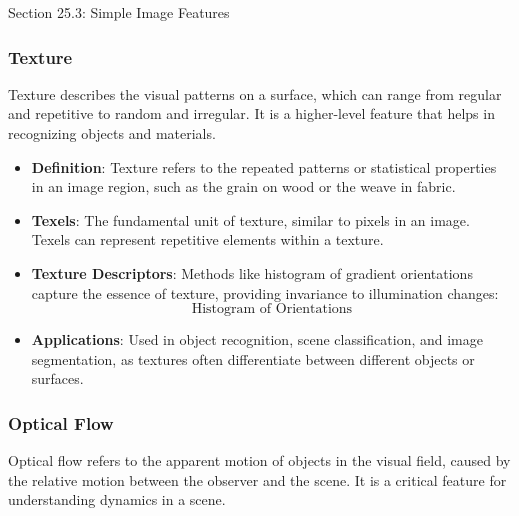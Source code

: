 \begin{notes}{Section 25.3: Simple Image Features}
\begin{highlight}[Edges]
    \end{highlight}
    
    \subsubsection*{Texture}
    
    Texture describes the visual patterns on a surface, which can range from regular and repetitive to random and irregular. It is a higher-level feature that helps in recognizing objects and materials.
    
    \begin{highlight}[Texture]
    
        \begin{itemize}
            \item \textbf{Definition}: Texture refers to the repeated patterns or statistical properties in an image region, such as the grain on wood or the weave in fabric.
            \item \textbf{Texels}: The fundamental unit of texture, similar to pixels in an image. Texels can represent repetitive elements within a texture.
            \item \textbf{Texture Descriptors}: Methods like histogram of gradient orientations capture the essence of texture, providing invariance to illumination changes:
            \[
            \text{Histogram of Orientations}
            \]
            \item \textbf{Applications}: Used in object recognition, scene classification, and image segmentation, as textures often differentiate between different objects or surfaces.
        \end{itemize}
    
    \end{highlight}
    
    \subsubsection*{Optical Flow}
    
    Optical flow refers to the apparent motion of objects in the visual field, caused by the relative motion between the observer and the scene. It is a critical feature for understanding dynamics in a scene.
    
    \begin{highlight}
    

\end{highlight}
\end{notes}
